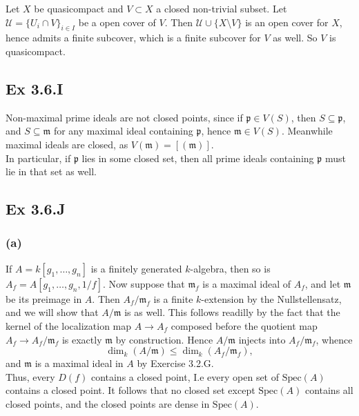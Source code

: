 \documentclass{article}
\theoremstyle{definition}
\newcommand{\Spec}{\text{Spec}}
\begin{document}
Let $X$ be quasicompact and $V \subset X$ a closed non-trivial subset. Let
$\mathcal{U} = \{U_i \cap V\}_{i \in I}$ be a open cover of $V$. Then
$\mathcal{U} \cup \{X \setminus V\}$ is an open cover for $X$, hence admits a
finite subcover, which is a finite subcover for $V$ as well. So $V$ is
quasicompact.

\subsection*{Ex 3.6.I}

Non-maximal prime ideals are not closed points, since if $\mathfrak{p} \in
V(S)$, then $S \subseteq \mathfrak{p}$, and $S \subseteq \mathfrak{m}$ for any
maximal ideal containing $\mathfrak{p}$, hence $\mathfrak{m} \in V(S)$.
Meanwhile maximal ideals are closed, as $V(\mathfrak{m}) = [(\mathfrak{m})]$. \\

In particular, if $\mathfrak{p}$ lies in some closed set, then all prime ideals
containing $\mathfrak{p}$ must lie in that set as well.

\subsection*{Ex 3.6.J}

\subsubsection*{(a)}


If $A = k[g_1, \ldots, g_n]$ is a finitely generated $k$-algebra, then so is
$A_f = A[g_1, \ldots, g_n, 1/f]$. Now suppose that $\mathfrak{m}_f$ is a
maximal ideal of $A_f$, and let $\mathfrak{m}$ be its preimage in $A$. Then
$A_f / \mathfrak{m}_f$ is a finite $k$-extension by the Nullstellensatz, and we
will show that $A/\mathfrak{m}$ is as well. This follows readilly by the fact
that the kernel of the localization map $A \to A_f$ composed before the
quotient map $A_f \to A_f / \mathfrak{m}_f$ is exactly $\mathfrak{m}$ by
construction. Hence $A/\mathfrak{m}$ injects into $A_f / \mathfrak{m}_f$,
whence 
\[
	\dim_k(A/\mathfrak{m})
	\leq 
	\dim_k(A_f/\mathfrak{m}_f),
\] 
and $\mathfrak{m}$ is a maximal ideal in $A$ by Exercise 3.2.G. \\

Thus, every $D(f)$ contains a closed point, I.e every open set of $\Spec(A)$
contains a closed point. It follows that no closed set except $\Spec(A)$
contains all closed points, and the closed points are dense in $\Spec(A)$.
\end{document}
